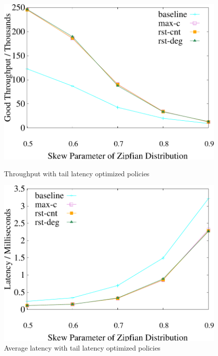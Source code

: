 \begin{figure}[t]
    \centering
	\begin{minipage}[b]{0.32\linewidth}
	\centering
	\includegraphics[width=\textwidth]{./exp_fig/restart/tps}
	\vspace{-2em}
	\caption{Throughput with tail latency optimized policies}
	\label{fig:restart:tps}
	\end{minipage}
    \begin{minipage}[b]{0.32\linewidth}
	\centering
	\includegraphics[width=\textwidth]{./exp_fig/restart/latency}
	\vspace{-2em}
	\caption{Average latency with tail latency optimized policies}
	\label{fig:restart:latency}
	\end{minipage}

\end{figure}
